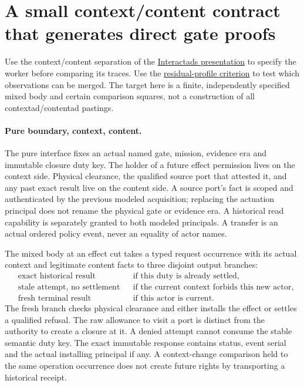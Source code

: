 \documentclass{article}
\begin{document}
\section*{A small context/content contract that generates direct gate proofs}
Use the context/content separation of the
\href{https://github.com/eternal-november/eos-research-programmes/blob/4359a8a1484498b9c46d8e58a0112448a1fba06b/projects/contextual-composition/publications/interactads/Interactads.tex}{Interactads presentation}
to specify the worker before comparing its traces. Use the
\href{https://github.com/eternal-november/eos-research-programmes/blob/4359a8a1484498b9c46d8e58a0112448a1fba06b/projects/contextual-composition/feedback-and-concurrency/observable-covers/Residual_Profiles_and_Admission_Reflection.tex}{residual-profile criterion}
to test which observations can be merged. The target here is a
finite, independently specified mixed body and certain comparison
squares, not a construction of all contextad/contentad pastings.

\paragraph{Pure boundary, context, content.}
The pure interface fixes an actual named gate, mission, evidence
era and immutable closure duty key. The holder of a future
effect permission lives on the context side. Physical clearance,
the qualified source port that attested it, and any past exact
result live on the content side. A source port's fact is scoped and
authenticated by the previous modeled acquisition; replacing the
actuation principal does not rename the physical gate or evidence
era. A historical read capability is separately granted to both
modeled principals. A transfer is an actual ordered policy
event, never an equality of actor names.

The mixed body at an effect cut takes a typed request occurrence
with its actual context and legitimate content facts to three
disjoint output branches:
\[
 \begin{aligned}
 &\text{exact historical result} &&\text{if this duty is already settled},\\
 &\text{stale attempt, no settlement}&&\text{if the current context forbids this new actor},\\
 &\text{fresh terminal result}&&\text{if this actor is current}.
 \end{aligned}
\]
The fresh branch checks physical clearance and either installs the
effect or settles a qualified refusal. The raw allowance to visit a
port is distinct from the authority to create a closure at it.
A denied attempt cannot consume the stable semantic duty key.
The exact immutable response contains status, event serial and
the actual installing principal if any. A context-change comparison
held to the same operation occurrence does not create future rights
by transporting a historical receipt.
\end{document}
